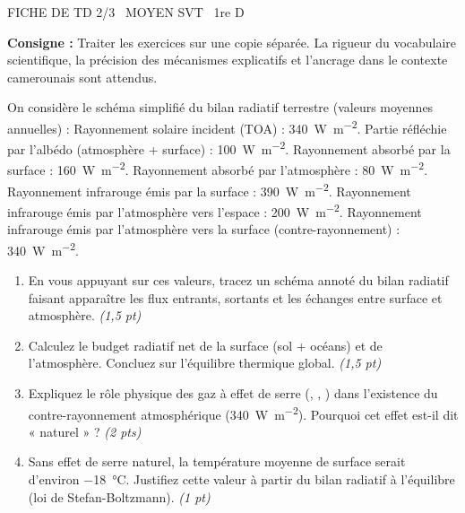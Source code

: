 \documentclass[11pt]{article}
\begin{document}
\begin{tcolorbox}[enhanced,colback=popink,colframe=popink,arc=10pt,boxrule=0pt,left=12pt,right=12pt,top=9pt,bottom=9pt]
{\color{white}\popxbold\small FICHE DE TD 2/3 \textbullet\ MOYEN \hfill SVT \textbullet\ 1re D\par}
\end{tcolorbox}
\vspace{4pt}

\noindent \textbf{Consigne :} Traiter les exercices sur une copie séparée. La rigueur du vocabulaire scientifique, la précision des mécanismes explicatifs et l'ancrage dans le contexte camerounais sont attendus.

\begin{exercice}
On considère le schéma simplifié du bilan radiatif terrestre (valeurs moyennes annuelles) :  
Rayonnement solaire incident (TOA) : \SI{340}{\watt\per\square\meter}.  
Partie réfléchie par l'albédo (atmosphère + surface) : \SI{100}{\watt\per\square\meter}.  
Rayonnement absorbé par la surface : \SI{160}{\watt\per\square\meter}.  
Rayonnement absorbé par l'atmosphère : \SI{80}{\watt\per\square\meter}.  
Rayonnement infrarouge émis par la surface : \SI{390}{\watt\per\square\meter}.  
Rayonnement infrarouge émis par l'atmosphère vers l'espace : \SI{200}{\watt\per\square\meter}.  
Rayonnement infrarouge émis par l'atmosphère vers la surface (contre-rayonnement) : \SI{340}{\watt\per\square\meter}.

\begin{enumerate}
    \item En vous appuyant sur ces valeurs, tracez un schéma annoté du bilan radiatif faisant apparaître les flux entrants, sortants et les échanges entre surface et atmosphère. \textit{(1,5 pt)}
    \item Calculez le budget radiatif net de la surface (sol + océans) et de l'atmosphère. Concluez sur l'équilibre thermique global. \textit{(1,5 pt)}
    \item Expliquez le rôle physique des gaz à effet de serre (, , ) dans l'existence du contre-rayonnement atmosphérique (\SI{340}{\watt\per\square\meter}). Pourquoi cet effet est-il dit « naturel » ? \textit{(2 pts)}
    \item Sans effet de serre naturel, la température moyenne de surface serait d'environ \SI{-18}{\celsius}. Justifiez cette valeur à partir du bilan radiatif à l'équilibre (loi de Stefan-Boltzmann). \textit{(1 pt)}
\end{enumerate}
\end{exercice}
\end{document}
